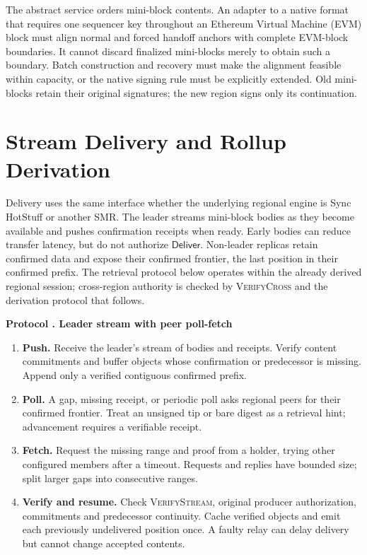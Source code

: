 \documentclass[11pt,a4paper,onecolumn]{article}
\newcommand{\Tag}[1]{\ensuremath{\mathsf{#1}}}
\newcommand{\Proc}[1]{\textnormal{\textsc{#1}}}
\newcounter{protocol}
\newenvironment{protocol}[2]{\refstepcounter{protocol}\label{#1}
\begin{mdframed}[nobreak=true,linewidth=.6pt,skipabove=9pt,skipbelow=9pt,
innertopmargin=7pt,innerbottommargin=7pt]\small
\noindent\textbf{Protocol \theprotocol. #2}\par\smallskip}{\end{mdframed}}
\begin{document}
The abstract service orders mini-block contents. An adapter to a native
format that requires one sequencer key throughout an Ethereum Virtual
Machine (EVM) block must align normal and forced handoff anchors with
complete EVM-block boundaries.
It cannot discard finalized mini-blocks merely to obtain such a boundary.
Batch construction and recovery must make the alignment feasible within
capacity, or the native signing rule must be explicitly extended. Old
mini-blocks retain their original signatures; the new region signs only
its continuation.

\section{Stream Delivery and Rollup Derivation}\label{sec:delivery}
Delivery uses the same interface whether the underlying regional engine is
Sync HotStuff or another SMR. The leader streams mini-block bodies as they
become available and pushes confirmation receipts when ready. Early bodies
can reduce transfer latency, but do not authorize \Tag{Deliver}.
Non-leader replicas retain confirmed data and expose their confirmed frontier,
the last position in their confirmed prefix. The retrieval protocol below
operates within the already derived regional session; cross-region authority
is checked by \Proc{VerifyCross} and the derivation protocol that follows.

\begin{protocol}{alg:retrieval}{Leader stream with peer poll-fetch}
\begin{enumerate}[label=\textbf{D\arabic*.}]
\item \textbf{Push.} Receive the leader's stream of bodies and receipts.
Verify content commitments and buffer objects whose confirmation or predecessor
is missing. Append only a verified contiguous confirmed prefix.
\item \textbf{Poll.} A gap, missing receipt, or periodic poll asks regional
peers for their confirmed frontier. Treat an unsigned tip or bare digest as
a retrieval hint; advancement requires a verifiable receipt.
\item \textbf{Fetch.} Request the missing range and proof from a holder,
trying other configured members after a timeout. Requests and replies have
bounded size; split larger gaps into consecutive ranges.
\item \textbf{Verify and resume.} Check \Proc{VerifyStream}, original producer
authorization, commitments and predecessor continuity. Cache verified objects
and emit each previously undelivered position once. A faulty relay can delay
delivery but cannot change accepted contents.
\end{enumerate}
\end{protocol}
\end{document}
